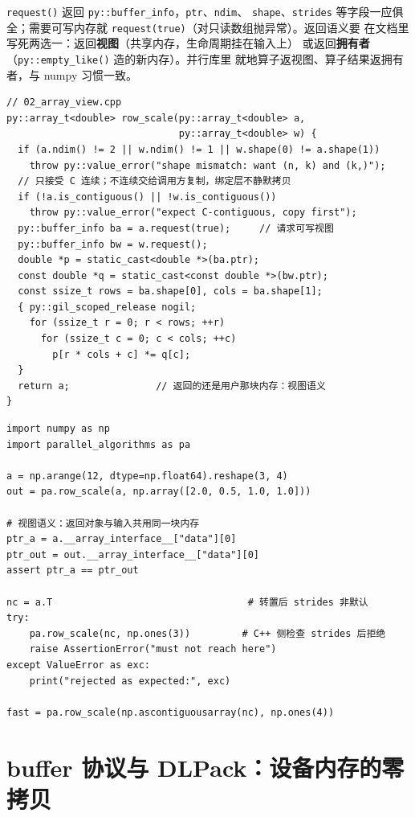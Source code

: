 \documentclass[12pt,a4paper,fontset=fandol]{ctexbook}
\newcommand{\Fn}[1]{\texttt{#1()}}
\newcommand{\Tp}[1]{\texttt{#1}}
\begin{document}
\Tp{request()} 返回 \Tp{py::buffer\_info}，\Tp{ptr}、\Tp{ndim}、
\Tp{shape}、\Tp{strides} 等字段一应俱全；需要可写内存就
\Tp{request(true)}（对只读数组抛异常）。返回语义要
在文档里写死两选一：返回\textbf{视图}（共享内存，生命周期挂在输入上）
或返回\textbf{拥有者}（\Fn{py::empty\_like} 造的新内存）。并行库里
就地算子返视图、算子结果返拥有者，与 numpy 习惯一致。

\begin{lstlisting}[style=cppstyle,caption={零拷贝读写与 strides 检查},label={lst:strides}]
// 02_array_view.cpp
py::array_t<double> row_scale(py::array_t<double> a,
                              py::array_t<double> w) {
  if (a.ndim() != 2 || w.ndim() != 1 || w.shape(0) != a.shape(1))
    throw py::value_error("shape mismatch: want (n, k) and (k,)");
  // 只接受 C 连续；不连续交给调用方复制，绑定层不静默拷贝
  if (!a.is_contiguous() || !w.is_contiguous())
    throw py::value_error("expect C-contiguous, copy first");
  py::buffer_info ba = a.request(true);     // 请求可写视图
  py::buffer_info bw = w.request();
  double *p = static_cast<double *>(ba.ptr);
  const double *q = static_cast<const double *>(bw.ptr);
  const ssize_t rows = ba.shape[0], cols = ba.shape[1];
  { py::gil_scoped_release nogil;
    for (ssize_t r = 0; r < rows; ++r)
      for (ssize_t c = 0; c < cols; ++c)
        p[r * cols + c] *= q[c];
  }
  return a;               // 返回的还是用户那块内存：视图语义
}
\end{lstlisting}

\begin{lstlisting}[style=pythonstyle,caption={调用侧：共享内存与不连续的验证}]
import numpy as np
import parallel_algorithms as pa

a = np.arange(12, dtype=np.float64).reshape(3, 4)
out = pa.row_scale(a, np.array([2.0, 0.5, 1.0, 1.0]))

# 视图语义：返回对象与输入共用同一块内存
ptr_a = a.__array_interface__["data"][0]
ptr_out = out.__array_interface__["data"][0]
assert ptr_a == ptr_out

nc = a.T                                  # 转置后 strides 非默认
try:
    pa.row_scale(nc, np.ones(3))         # C++ 侧检查 strides 后拒绝
    raise AssertionError("must not reach here")
except ValueError as exc:
    print("rejected as expected:", exc)

fast = pa.row_scale(np.ascontiguousarray(nc), np.ones(4))
\end{lstlisting}

\section{buffer 协议与 DLPack：设备内存的零拷贝}
\end{document}
